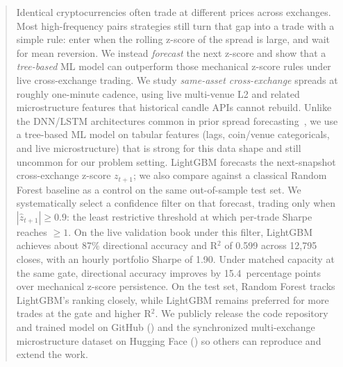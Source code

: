 \begin{abstract}
Identical cryptocurrencies often trade at different prices across exchanges. Most high-frequency pairs strategies still turn that gap into a trade with a simple rule: enter when the rolling z-score of the spread is large, and wait for mean reversion. We instead \emph{forecast} the next z-score and show that a \emph{tree-based} ML model can outperform those mechanical z-score rules under live cross-exchange trading. We study \emph{same-asset cross-exchange} spreads at roughly one-minute cadence, using live multi-venue L2 and related microstructure features that historical candle APIs cannot rebuild. Unlike the DNN/LSTM architectures common in prior spread forecasting~\cite{tsoku2026dl, liou2024hft, han2024lstm, sarmento2024ml, shen2022arbitrage, perrone2026pairs}, we use a tree-based ML model on tabular features (lags, coin/venue categoricals, and live microstructure) that is strong for this data shape and still uncommon for our problem setting. LightGBM forecasts the next-snapshot cross-exchange z-score $z_{t+1}$; we also compare against a classical Random Forest baseline as a control on the same out-of-sample test set. We systematically select a confidence filter on that forecast, trading only when $|\hat{z}_{t+1}| \geq 0.9$: the least restrictive threshold at which per-trade Sharpe reaches ${\geq}1$. On the live validation book under this filter, LightGBM achieves about 87\% directional accuracy and R$^2$ of 0.599 across 12{,}795 closes, with an hourly portfolio Sharpe of 1.90. Under matched capacity at the same gate, directional accuracy improves by 15.4~percentage points over mechanical z-score persistence. On the test set, Random Forest tracks LightGBM's ranking closely, while LightGBM remains preferred for more trades at the gate and higher R$^2$. We publicly release the code repository and trained model on GitHub (\coderef) and the synchronized multi-exchange microstructure dataset on Hugging Face (\datasetref) so others can reproduce and extend the work.
\end{abstract}
